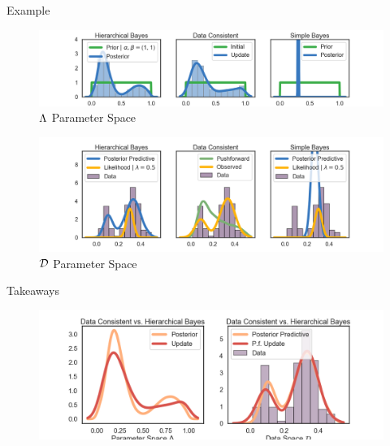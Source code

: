 \begin{block}{Example}
\begin{figure}
        \includegraphics[width=40cm]{figures/distr_EX_lambda_space.png}
        \vspace{-2.0cm}
        \centering
        \caption{ $\Lambda$ Parameter Space }
\end{figure}
\vspace{-1.5cm}
\begin{figure}
        \includegraphics[width=40cm]{figures/distr_EX_data_space.png}
        \vspace{-2.0cm}
        \centering
        \caption{$\mathcal{D}$ Parameter Space  }
\end{figure}


\end{block}





\begin{block}{Takeaways}

\centering
\begin{figure}
        \includegraphics[width=35cm]{figures/distr_EX_comparison.png}
        \vspace{-0.5cm}
        \caption{ }
    \end{figure}
\end{block}
